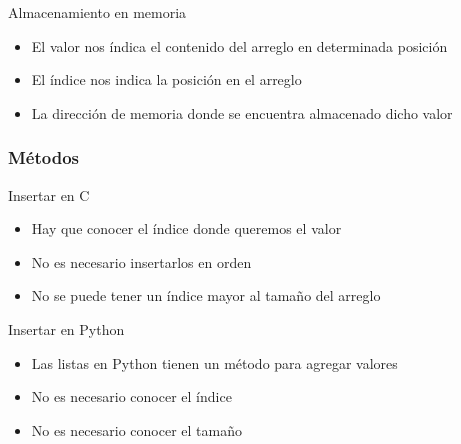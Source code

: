 \documentclass{beamer}
\newcommand{\Rplus}{\protect\hspace{-.1em}\protect\raisebox{.35ex}{\smaller{\smaller\textbf{+}}}}
\newcommand{\Cpp}{\mbox{C\Rplus\Rplus}\hspace{3pt}}
\begin{document}
\begin{frame}{Almacenamiento en memoria}
	\begin{itemize}
		\item El valor nos \'indica el contenido del arreglo en determinada posici\'on
		\item El \'indice nos indica la posici\'on en el arreglo
		\item La direcci\'on de memoria donde se encuentra almacenado dicho valor	
	\end{itemize}
	\centering
\end{frame}

\subsubsection{M\'etodos}

\begin{frame}{Insertar en \Cpp}
	\begin{itemize}
		\item Hay que conocer el \'indice donde queremos el valor
		\item No es necesario insertarlos en orden
		\item No se puede tener un \'indice mayor al tamaño del arreglo
	\end{itemize}
	\centering
\end{frame}

\begin{frame}{Insertar en Python}
	\begin{itemize}
		\item Las listas en Python tienen un m\'etodo para agregar valores
		\item No es necesario conocer el \'indice
		\item No es necesario conocer el tamaño 
	\end{itemize}
\end{frame}
\end{document}

